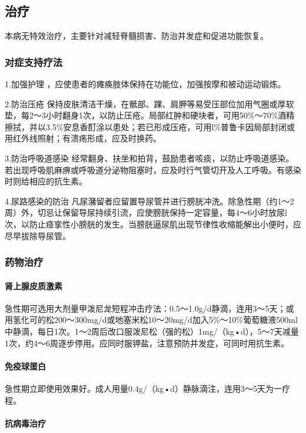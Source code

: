 \subsection{治疗}

本病无特效治疗，主要针对减轻脊髓损害、防治并发症和促进功能恢复。

\subsubsection{对症支持疗法}

1.加强护理 ，应使患者的瘫痪肢体保持在功能位，加强按摩和被动运动锻炼。

2.防治压疮
保持皮肤清洁干燥，在骶部、踝、肩胛等易受压部位加用气圈或厚软垫，每2～3小时翻身1次，以防止压疮。局部红肿和硬块者，可用50\%～70\%酒精擦拭，并以3.5\%安息香酊涂以患处；若已形成压疮，可用l\%普鲁卡因局部封闭或用红外线照射；有溃疡形成，应及时换药。

3.防治呼吸道感染
经常翻身、扶坐和拍背，鼓励患者咳痰，以防止呼吸道感染。若出现呼吸肌麻痹或呼吸道分泌物阻塞时，应及时行气管切开及人工呼吸。有感染时则给相应的抗生素。

4.尿路感染的防治
凡尿潴留者应留置导尿管并进行膀胱冲洗。除急性期（约1～2周）外，切忌让保留导尿持续引流，应使膀胱保持一定容量，每4～6小时放尿l次，以防止痉挛性小膀胱的发生。当膀胱逼尿肌出现节律性收缩能解出小便时，应尽早拔除导尿管。

\subsubsection{药物治疗}

\paragraph{肾上腺皮质激素}

急性期可选用大剂量甲泼尼龙短程冲击疗法：0.5～1.0g/d静滴，连用3～5天；或用氢化可的松200～300mg/d或地塞米松10～20mg/d加入5\%～10\%葡萄糖液500ml中静滴，每日1次。1～2周后改口服泼尼松（强的松）1mg/（kg•d），5～7天减量1次，约4～6周逐步停用。应同时服钾盐，注意预防并发症，可同时用抗生素。

\paragraph{免疫球蛋白}

急性期立即使用效果好。成人用量0.4g/（kg•d）静脉滴注，连用3～5天为一疗程。

\paragraph{抗病毒治疗}

